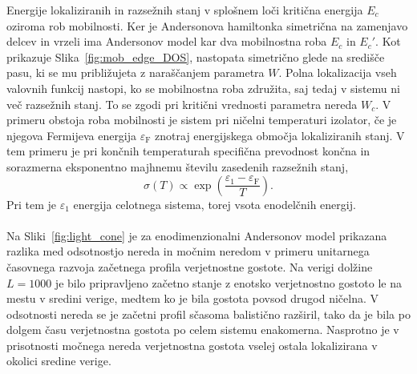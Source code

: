  Energije lokaliziranih in razsežnih stanj v splošnem loči kritična energija $E_c$ oziroma rob mobilnosti. Ker je Andersonova hamiltonka simetrična na zamenjavo delcev in vrzeli ima Andersonov model kar dva mobilnostna roba $E_c$ in $E_c'$. Kot prikazuje Slika~\ref{fig:mob_edge_DOS}, nastopata simetrično glede na središče pasu, ki se mu približujeta z naraščanjem parametra $W$. Polna lokalizacija vseh valovnih funkcij nastopi, ko se mobilnostna roba združita, saj tedaj v sistemu ni več razsežnih stanj. To se zgodi pri kritični vrednosti parametra nereda $W_c$. V primeru obstoja roba mobilnosti je sistem pri ničelni temperaturi izolator, če je njegova Fermijeva energija $\varepsilon_\mathrm{F}$ znotraj energijskega območja lokaliziranih stanj. V tem primeru je pri končnih temperaturah specifična prevodnost končna in sorazmerna eksponentno majhnemu številu zasedenih razsežnih stanj,
\begin{equation}
\sigma(T)\propto \exp\left(\frac{\varepsilon_1 - \varepsilon_\mathrm{F}}{T}\right).
\end{equation}
Pri tem je $\varepsilon_1$ energija celotnega sistema, torej vsota enodelčnih energij.  \\\\
Na Sliki~\ref{fig:light_cone} je za enodimenzionalni Andersonov model prikazana razlika med odsotnostjo nereda in močnim neredom v primeru unitarnega časovnega razvoja začetnega profila verjetnostne gostote. Na verigi dolžine $L=1000$ je bilo pripravljeno začetno stanje z enotsko verjetnostno gostoto le na mestu v sredini verige, medtem ko je bila gostota povsod drugod ničelna. V odsotnosti nereda se je začetni profil sčasoma balistično razširil, tako da je bila po dolgem času verjetnostna gostota po celem sistemu enakomerna. Nasprotno je v prisotnosti močnega nereda verjetnostna gostota vselej ostala lokalizirana v okolici sredine verige. \newpage

